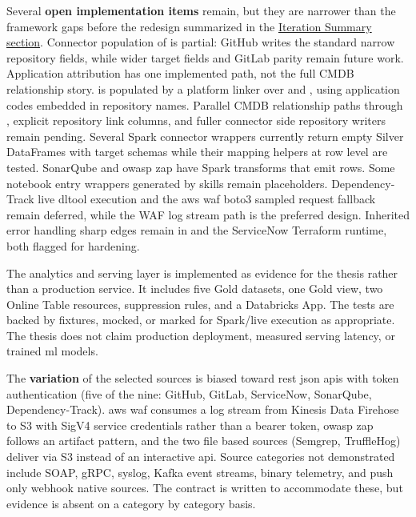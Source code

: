 Several \textbf{open implementation items} remain, but they are narrower than the framework gaps before the redesign summarized in the \hyperref[sec:iteration-summary]{Iteration Summary section}. Connector population of  is partial: GitHub writes the standard narrow repository fields, while wider target fields and GitLab parity remain future work. Application attribution has one implemented path, not the full CMDB relationship story.  is populated by a platform linker over  and , using application codes embedded in repository names. Parallel CMDB relationship paths through , explicit repository link columns, and fuller connector side repository writers remain pending. Several Spark connector wrappers currently return empty Silver DataFrames with target schemas while their mapping helpers at row level are tested. SonarQube and \gls{owasp} \gls{zap} have Spark transforms that emit rows. Some notebook entry wrappers generated by skills remain placeholders. Dependency-Track live dltool execution and the \gls{aws} \gls{waf} boto3 sampled request fallback remain deferred, while the WAF log stream path is the preferred design. Inherited error handling sharp edges remain in  and the ServiceNow Terraform runtime, both flagged for hardening.

The analytics and serving layer is implemented as evidence for the thesis rather than a production service. It includes five Gold datasets, one Gold view, two Online Table resources, suppression rules, and a Databricks App. The tests are backed by fixtures, mocked, or marked for Spark/live execution as appropriate. The thesis does not claim production deployment, measured serving latency, or trained \gls{ml} models.

The \textbf{variation} of the selected sources is biased toward \gls{rest} \gls{json} \glspl{api} with token authentication (five of the nine: GitHub, GitLab, ServiceNow, SonarQube, Dependency-Track). \gls{aws} \gls{waf} consumes a log stream from Kinesis Data Firehose to S3 with SigV4 service credentials rather than a bearer token, \gls{owasp} \gls{zap} follows an artifact pattern, and the two file based sources (Semgrep, TruffleHog) deliver via S3 instead of an interactive \gls{api}. Source categories not demonstrated include SOAP, gRPC, syslog, Kafka event streams, binary telemetry, and push only webhook native sources. The contract is written to accommodate these, but evidence is absent on a category by category basis.

